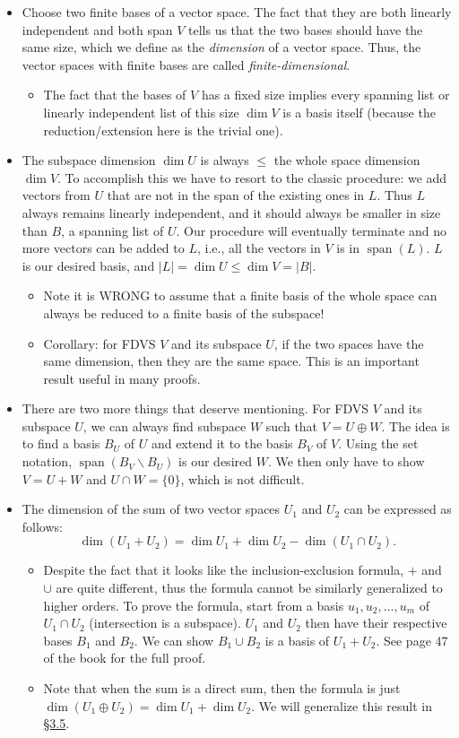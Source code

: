 \documentclass[11pt]{article}
\newcommand{\lk}[2]{\hyperlink{subsection.#1.#2}{\S#1.#2}}
\newcommand{\df}[1]{\textit{\textsf{#1}}}
\newcommand{\s}{\operatorname{span}}
\renewcommand{\d}{\dim}
\newcommand{\abs}[1]{\lvert #1 \rvert}
\begin{document}
\begin{itemize}
    \item Choose two finite bases of a vector space. The fact that they are both linearly independent and both span $V$ tells us that the two bases should have the same size, which we define as the \df{dimension} of a vector space. Thus, the vector spaces with finite bases are called \df{finite-dimensional}.
    \begin{itemize}
        \item The fact that the bases of $V$ has a fixed size implies every spanning list or linearly independent list of this size $\d V$ is a basis itself (because the reduction/extension here is the trivial one).
    \end{itemize}
    \item The subspace dimension $\d U$ is always $\leq$ the whole space dimension $\d V$. To accomplish this we have to resort to the classic procedure: we add vectors from $U$ that are not in the span of the existing ones in $L$. Thus $L$ always remains linearly independent, and it should always be smaller in size than $B$, a spanning list of $U$. Our procedure will eventually terminate and no more vectors can be added to $L$, i.e., all the vectors in $V$ is in $\s(L)$. $L$ is our desired basis, and $\abs{L} = \d U \leq \d V = \abs{B}$.
    \begin{itemize}
        \item Note it is WRONG to assume that a finite basis of the whole space can always be reduced to a finite basis of the subspace!
        \item Corollary: for FDVS $V$ and its subspace $U$, if the two spaces have the same dimension, then they are the same space. This is an important result useful in many proofs.
    \end{itemize}
    \item There are two more things that deserve mentioning. For FDVS $V$ and its subspace $U$, we can always find subspace $W$ such that $V = U \oplus W$. The idea is to find a basis $B_U$ of $U$ and extend it to the basis $B_V$ of $V$. Using the set notation, $\s(B_V \backslash B_U)$ is our desired $W$. We then only have to show $V = U+W$ and $U \cap W = \{0\}$, which is not difficult.
    \item The dimension of the sum of two vector spaces $U_1$ and $U_2$ can be expressed as follows: \[\d (U_1 + U_2) = \d U_1 + \d U_2 - \d (U_1 \cap U_2).\]
    \begin{itemize}
        \item Despite the fact that it looks like the inclusion-exclusion formula, $+$ and $\cup$ are quite different, thus the formula cannot be similarly generalized to higher orders. To prove the formula, start from a basis $u_1,u_2,\dots,u_m$ of $U_1 \cap U_2$ (intersection is a subspace). $U_1$ and $U_2$ then have their respective bases $B_1$ and $B_2$. We can show $B_1 \cup B_2$ is a basis of $U_1 + U_2$. See page 47 of the book for the full proof.
        \item Note that when the sum is a direct sum, then the formula is just $\d(U_1 \oplus U_2) = \d U_1 + \d U_2$. We will generalize this result in \lk{3}{5}.
    \end{itemize}
\end{itemize}
\end{document}
